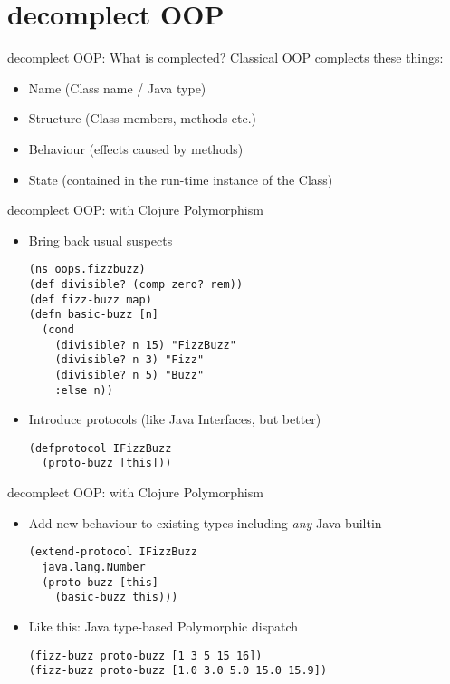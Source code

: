\documentclass[presentation]{beamer}
\begin{document}
\section{decomplect OOP}
\label{sec:orge77f11f}
\begin{frame}[label={sec:org18fbbad}]{decomplect OOP: What is complected?}
Classical OOP complects these things:
\begin{itemize}
\item Name (Class name / Java type)
\item Structure (Class members, methods etc.)
\item Behaviour (effects caused by methods)
\item State (contained in the run-time instance of the Class)
\end{itemize}
\end{frame}
\begin{frame}[label={sec:orgdcce424},fragile]{decomplect OOP: with Clojure Polymorphism}
 \begin{itemize}
\item Bring back usual suspects
\begin{verbatim}
(ns oops.fizzbuzz)
(def divisible? (comp zero? rem))
(def fizz-buzz map)
(defn basic-buzz [n]
  (cond
    (divisible? n 15) "FizzBuzz"
    (divisible? n 3) "Fizz"
    (divisible? n 5) "Buzz"
    :else n))
\end{verbatim}
\item Introduce protocols (like Java Interfaces, but better)
\begin{verbatim}
(defprotocol IFizzBuzz
  (proto-buzz [this]))
\end{verbatim}
\end{itemize}
\end{frame}
\begin{frame}[label={sec:orgf1eb234},fragile]{decomplect OOP: with Clojure Polymorphism}
 \begin{itemize}
\item Add new behaviour to existing types including \emph{any} Java builtin
\begin{verbatim}
(extend-protocol IFizzBuzz
  java.lang.Number
  (proto-buzz [this]
    (basic-buzz this)))
\end{verbatim}
\item Like this: Java type-based Polymorphic dispatch
\begin{verbatim}
(fizz-buzz proto-buzz [1 3 5 15 16])
(fizz-buzz proto-buzz [1.0 3.0 5.0 15.0 15.9])
\end{verbatim}
\end{itemize}
\end{frame}
\end{document}
